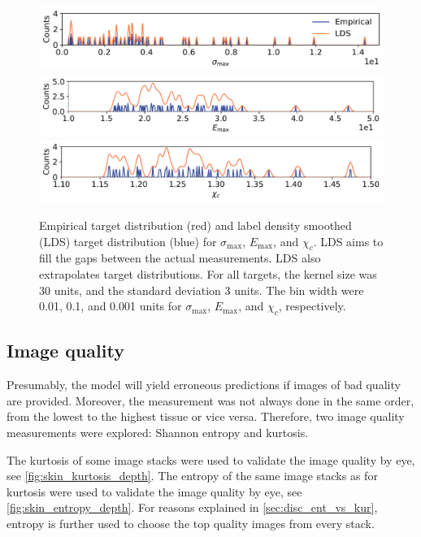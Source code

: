 \begin{figure}
    \centering
    \includegraphics[width=\linewidth]{skinstression/images/lds/a.pdf} \\
    \includegraphics[width=\linewidth]{skinstression/images/lds/k.pdf} \\
    \includegraphics[width=\linewidth]{skinstression/images/lds/xc.pdf}
    \caption[Label density smoothed target distributions]{
        Empirical target distribution (red) and label density smoothed (LDS) target distribution (blue) for $\sigma_\mathrm{max}$, $E_\mathrm{max}$, and $\chi_c$.
        LDS aims to fill the gaps between the actual measurements.
        LDS also extrapolates target distributions.
        For all targets, the kernel size was 30 units, and the standard deviation 3 units.
        The bin width were \num{0.01}, \num{0.1}, and \num{0.001} units for $\sigma_\mathrm{max}$, $E_\mathrm{max}$, and $\chi_c$, respectively.
    }
    \label{fig:skin_lds}
\end{figure}


\subsection{Image quality}
Presumably, the model will yield erroneous predictions if images of bad quality are provided.
Moreover, the measurement was not always done in the same order, \ie from the lowest to the highest tissue or vice versa.
Therefore, two image quality measurements were explored: Shannon entropy and kurtosis.

The kurtosis of some image stacks were used to validate the image quality by eye, see \cref{fig:skin_kurtosis_depth}.
The entropy of the same image stacks as for kurtosis were used to validate the image quality by eye, see \cref{fig:skin_entropy_depth}.
For reasons explained in \cref{sec:disc_ent_vs_kur}, entropy is further used to choose the top quality images from every stack.

